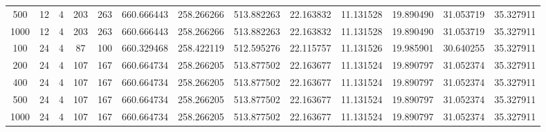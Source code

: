 \begin{table}[h]
\begin{tabular}{ccccccccccccc}
500 & 12 & 4 & 203 & 263 & 660.666443 & 258.266266 & 513.882263 & 22.163832 & 11.131528 & 19.890490 & 31.053719 & 35.327911 \\
1000 & 12 & 4 & 203 & 263 & 660.666443 & 258.266266 & 513.882263 & 22.163832 & 11.131528 & 19.890490 & 31.053719 & 35.327911 \\
100 & 24 & 4 & 87 & 100 & 660.329468 & 258.422119 & 512.595276 & 22.115757 & 11.131526 & 19.985901 & 30.640255 & 35.327911 \\
200 & 24 & 4 & 107 & 167 & 660.664734 & 258.266205 & 513.877502 & 22.163677 & 11.131524 & 19.890797 & 31.052374 & 35.327911 \\
400 & 24 & 4 & 107 & 167 & 660.664734 & 258.266205 & 513.877502 & 22.163677 & 11.131524 & 19.890797 & 31.052374 & 35.327911 \\
500 & 24 & 4 & 107 & 167 & 660.664734 & 258.266205 & 513.877502 & 22.163677 & 11.131524 & 19.890797 & 31.052374 & 35.327911 \\
1000 & 24 & 4 & 107 & 167 & 660.664734 & 258.266205 & 513.877502 & 22.163677 & 11.131524 & 19.890797 & 31.052374 & 35.327911 \\
\bottomrule
\end{tabular}
\end{table}
